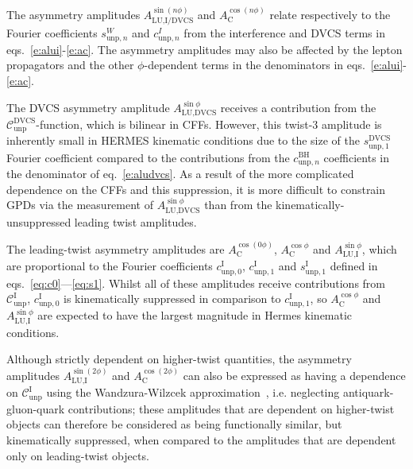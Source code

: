 \documentclass[11pt,a4paper]{article}
\begin{document}
The asymmetry amplitudes $A_{\textrm{LU,I/DVCS}}^{\sin(n\phi)}$ and
$A_{\textrm{C}}^{\cos(n\phi)}$ relate respectively to the Fourier
coefficients $s_{\textrm{unp},n}^{W}$ and $c_{\textrm{unp},n}^{I}$ from the interference and DVCS terms in eqs.~\ref{e:alui}-\ref{e:ac}. The asymmetry amplitudes
may also be affected by the lepton propagators and the other
$\phi$-dependent terms in the denominators in
eqs.~\ref{e:alui}-\ref{e:ac}.

The DVCS asymmetry amplitude $A^{\sin\phi}_{\textrm{LU,DVCS}}$ receives a
contribution from the $\mathcal{C}_{\textrm{unp}}^{\textrm{DVCS}}$-function,
which is bilinear in CFFs. However, this twist-3 amplitude is inherently small in HERMES kinematic conditions due to the size of the $s_{\textrm{unp},1}^{\textrm{DVCS}}$ Fourier coefficient compared to the contributions from the $c_{\textrm{unp},n}^{\textrm{BH}}$ coefficients in the denominator of eq.~\ref{e:aludvcs}. As a result of the more complicated dependence on the CFFs and this suppression, it
is more difficult to constrain GPDs via the measurement of $A^{\sin\phi}_{\textrm{LU,DVCS}}$ than from the kinematically-unsuppressed leading twist amplitudes.

The leading-twist asymmetry amplitudes are $A_{\textrm{C}}^{\cos(0\phi)}$, $A_{\textrm{C}}^{\cos\phi}$ and $A_{\textrm{LU,I}}^{\sin\phi}$, which are proportional to the Fourier coefficients $c_{\textrm{unp},0}^{\textrm{I}}$, $c_{\textrm{unp},1}^{\textrm{I}}$ and $s_{\textrm{unp},1}^{\textrm{I}}$ defined in eqs.~\ref{eq:c0}---\ref{eq:s1}. Whilst all of these amplitudes receive contributions from $\mathcal{C}_{\textrm{unp}}^{\textrm{I}}$, $c_{\textrm{unp},0}^{\textrm{I}}$ is kinematically suppressed in comparison to $c_{\textrm{unp},1}^{\textrm{I}}$, so $A_{\textrm{C}}^{\cos\phi}$ and $A_{\textrm{LU,I}}^{\sin\phi}$ are expected to have the largest magnitude in H{\sc ermes} kinematic conditions.

Although strictly dependent on higher-twist quantities, the asymmetry amplitudes $A_{\textrm{LU},\textrm{I}}^{\sin(2\phi)}$ and $A^{\cos(2\phi)}_{\textrm{C}}$ can also be expressed as having a dependence on $\mathcal{C}_{\textrm{unp}}^{\textrm{I}}$ using the Wandzura-Wilzcek approximation~\cite{Wan}, i.e. neglecting antiquark-gluon-quark contributions; these amplitudes that are dependent on higher-twist objects can therefore be considered as being functionally similar, but kinematically suppressed, when compared to the amplitudes that are dependent only on leading-twist objects.
\end{document}
